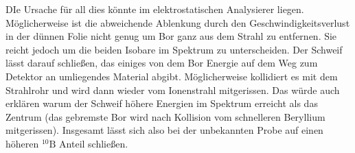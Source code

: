 DIe Ursache für all dies könnte im elektrostatischen Analysierer liegen.
Möglicherweise ist die abweichende Ablenkung durch den Geschwindigkeitsverlust in der dünnen Folie nicht genug um Bor ganz aus dem Strahl zu entfernen.
Sie reicht jedoch um die beiden Isobare im Spektrum zu unterscheiden.
Der Schweif lässt darauf schließen, das einiges von dem Bor Energie auf dem Weg zum Detektor an umliegendes Material abgibt.
Möglicherweise kollidiert es mit dem Strahlrohr und wird dann wieder vom Ionenstrahl mitgerissen.
Das würde auch erklären warum der Schweif höhere Energien im Spektrum erreicht als das Zentrum (das gebremste Bor wird nach Kollision vom schnelleren Beryllium mitgerissen).
Insgesamt lässt sich also bei der unbekannten Probe auf einen höheren $^{10}\text{B}$ Anteil schließen.
